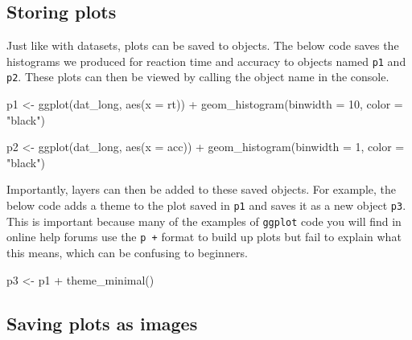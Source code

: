 \documentclass[
  english,
  doc,floatsintext]{apa6}
\newenvironment{Shaded}{\begin{snugshade}}{\end{snugshade}}
\newcommand{\AttributeTok}[1]{\textcolor[rgb]{0.77,0.63,0.00}{#1}}
\newcommand{\DecValTok}[1]{\textcolor[rgb]{0.00,0.00,0.81}{#1}}
\newcommand{\FunctionTok}[1]{\textcolor[rgb]{0.00,0.00,0.00}{#1}}
\newcommand{\NormalTok}[1]{#1}
\newcommand{\OtherTok}[1]{\textcolor[rgb]{0.56,0.35,0.01}{#1}}
\newcommand{\SpecialCharTok}[1]{\textcolor[rgb]{0.00,0.00,0.00}{#1}}
\newcommand{\StringTok}[1]{\textcolor[rgb]{0.31,0.60,0.02}{#1}}
\begin{document}
\hypertarget{storing-plots}{%
\subsection{Storing plots}\label{storing-plots}}

Just like with datasets, plots can be saved to objects. The below code saves the histograms we produced for reaction time and accuracy to objects named \texttt{p1} and \texttt{p2}. These plots can then be viewed by calling the object name in the console.

\begin{Shaded}
\begin{Highlighting}[]
\NormalTok{p1 }\OtherTok{\textless{}{-}} \FunctionTok{ggplot}\NormalTok{(dat\_long, }\FunctionTok{aes}\NormalTok{(}\AttributeTok{x =}\NormalTok{ rt)) }\SpecialCharTok{+}
  \FunctionTok{geom\_histogram}\NormalTok{(}\AttributeTok{binwidth =} \DecValTok{10}\NormalTok{, }\AttributeTok{color =} \StringTok{"black"}\NormalTok{)}

\NormalTok{p2 }\OtherTok{\textless{}{-}} \FunctionTok{ggplot}\NormalTok{(dat\_long, }\FunctionTok{aes}\NormalTok{(}\AttributeTok{x =}\NormalTok{ acc)) }\SpecialCharTok{+}
  \FunctionTok{geom\_histogram}\NormalTok{(}\AttributeTok{binwidth =} \DecValTok{1}\NormalTok{, }\AttributeTok{color =} \StringTok{"black"}\NormalTok{) }
\end{Highlighting}
\end{Shaded}

Importantly, layers can then be added to these saved objects. For example, the below code adds a theme to the plot saved in \texttt{p1} and saves it as a new object \texttt{p3}. This is important because many of the examples of \texttt{ggplot} code you will find in online help forums use the \texttt{p\ +} format to build up plots but fail to explain what this means, which can be confusing to beginners.

\begin{Shaded}
\begin{Highlighting}[]
\NormalTok{p3 }\OtherTok{\textless{}{-}}\NormalTok{ p1 }\SpecialCharTok{+} \FunctionTok{theme\_minimal}\NormalTok{()}
\end{Highlighting}
\end{Shaded}

\hypertarget{saving-plots-as-images}{%
\subsection{Saving plots as images}\label{saving-plots-as-images}}
\end{document}
